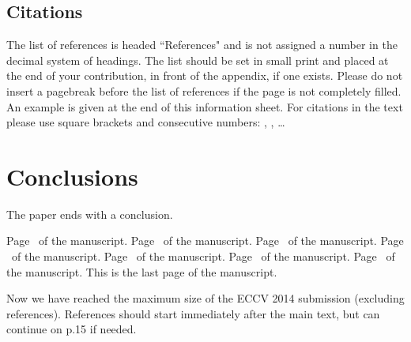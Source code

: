 \documentclass[runningheads]{llncs}
\begin{document}
\subsection{Citations}

The list of references is headed ``References" and is not assigned a
number
in the decimal system of headings. The list should be set in small print
and placed at the end of your contribution, in front of the appendix,
if one exists.
Please do not insert a pagebreak before the list of references if the
page is not completely filled.
An example is given at the
end of this information sheet. For citations in the text please use
square brackets and consecutive numbers: \cite{Alpher02},
\cite{Alpher03}, \cite{Alpher04} \dots

\section{Conclusions}

The paper ends with a conclusion. 


\clearpage\mbox{}Page \thepage\ of the manuscript.
\clearpage\mbox{}Page \thepage\ of the manuscript.
\clearpage\mbox{}Page \thepage\ of the manuscript.
\clearpage\mbox{}Page \thepage\ of the manuscript.
\clearpage\mbox{}Page \thepage\ of the manuscript.
\clearpage\mbox{}Page \thepage\ of the manuscript.
\clearpage\mbox{}Page \thepage\ of the manuscript.
This is the last page of the manuscript.
\par\vfill\par
Now we have reached the maximum size of the ECCV 2014 submission (excluding references).
References should start immediately after the main text, but can continue on p.15 if needed.

\clearpage



\end{document}
